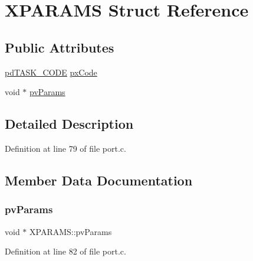 \hypertarget{struct_x_p_a_r_a_m_s}{}\section{X\+P\+A\+R\+A\+MS Struct Reference}
\label{struct_x_p_a_r_a_m_s}
\subsection*{Public Attributes}
\begin{DoxyCompactItemize}
\item 
\hyperlink{vendor_2ceedling_2plugins_2freertos_2vendor_2freertos_2include_2_free_r_t_o_s_8h_a74cee96c96792dab96bdc57ba9007b24}{pd\+T\+A\+S\+K\+\_\+\+C\+O\+DE} \hyperlink{struct_x_p_a_r_a_m_s_a2ad67da126016f1c10ec077ca41b74be}{px\+Code}
\item 
void $\ast$ \hyperlink{struct_x_p_a_r_a_m_s_a97a762acac0b14403a5d7059605f90ef}{pv\+Params}
\end{DoxyCompactItemize}


\subsection{Detailed Description}


Definition at line 79 of file port.\+c.



\subsection{Member Data Documentation}
\mbox{\label{struct_x_p_a_r_a_m_s_a97a762acac0b14403a5d7059605f90ef}} 
\subsubsection{\texorpdfstring{pv\+Params}{pvParams}}
{\footnotesize\ttfamily void $\ast$ X\+P\+A\+R\+A\+M\+S\+::pv\+Params}



Definition at line 82 of file port.\+c.

\mbox{\label{struct_x_p_a_r_a_m_s_a2ad67da126016f1c10ec077ca41b74be}} 
